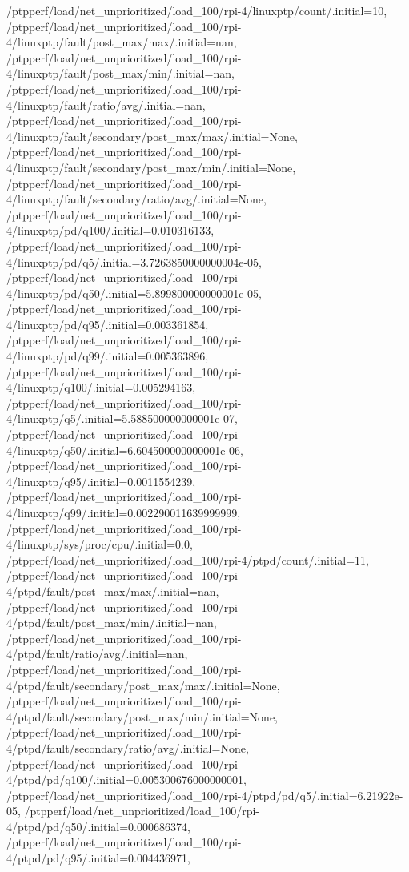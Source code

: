 {    /ptpperf/load/net_unprioritized/load_100/rpi-4/linuxptp/count/.initial=10,
    /ptpperf/load/net_unprioritized/load_100/rpi-4/linuxptp/fault/post_max/max/.initial=nan,
    /ptpperf/load/net_unprioritized/load_100/rpi-4/linuxptp/fault/post_max/min/.initial=nan,
    /ptpperf/load/net_unprioritized/load_100/rpi-4/linuxptp/fault/ratio/avg/.initial=nan,
    /ptpperf/load/net_unprioritized/load_100/rpi-4/linuxptp/fault/secondary/post_max/max/.initial=None,
    /ptpperf/load/net_unprioritized/load_100/rpi-4/linuxptp/fault/secondary/post_max/min/.initial=None,
    /ptpperf/load/net_unprioritized/load_100/rpi-4/linuxptp/fault/secondary/ratio/avg/.initial=None,
    /ptpperf/load/net_unprioritized/load_100/rpi-4/linuxptp/pd/q100/.initial=0.010316133,
    /ptpperf/load/net_unprioritized/load_100/rpi-4/linuxptp/pd/q5/.initial=3.7263850000000004e-05,
    /ptpperf/load/net_unprioritized/load_100/rpi-4/linuxptp/pd/q50/.initial=5.899800000000001e-05,
    /ptpperf/load/net_unprioritized/load_100/rpi-4/linuxptp/pd/q95/.initial=0.003361854,
    /ptpperf/load/net_unprioritized/load_100/rpi-4/linuxptp/pd/q99/.initial=0.005363896,
    /ptpperf/load/net_unprioritized/load_100/rpi-4/linuxptp/q100/.initial=0.005294163,
    /ptpperf/load/net_unprioritized/load_100/rpi-4/linuxptp/q5/.initial=5.588500000000001e-07,
    /ptpperf/load/net_unprioritized/load_100/rpi-4/linuxptp/q50/.initial=6.604500000000001e-06,
    /ptpperf/load/net_unprioritized/load_100/rpi-4/linuxptp/q95/.initial=0.0011554239,
    /ptpperf/load/net_unprioritized/load_100/rpi-4/linuxptp/q99/.initial=0.002290011639999999,
    /ptpperf/load/net_unprioritized/load_100/rpi-4/linuxptp/sys/proc/cpu/.initial=0.0,
    /ptpperf/load/net_unprioritized/load_100/rpi-4/ptpd/count/.initial=11,
    /ptpperf/load/net_unprioritized/load_100/rpi-4/ptpd/fault/post_max/max/.initial=nan,
    /ptpperf/load/net_unprioritized/load_100/rpi-4/ptpd/fault/post_max/min/.initial=nan,
    /ptpperf/load/net_unprioritized/load_100/rpi-4/ptpd/fault/ratio/avg/.initial=nan,
    /ptpperf/load/net_unprioritized/load_100/rpi-4/ptpd/fault/secondary/post_max/max/.initial=None,
    /ptpperf/load/net_unprioritized/load_100/rpi-4/ptpd/fault/secondary/post_max/min/.initial=None,
    /ptpperf/load/net_unprioritized/load_100/rpi-4/ptpd/fault/secondary/ratio/avg/.initial=None,
    /ptpperf/load/net_unprioritized/load_100/rpi-4/ptpd/pd/q100/.initial=0.005300676000000001,
    /ptpperf/load/net_unprioritized/load_100/rpi-4/ptpd/pd/q5/.initial=6.21922e-05,
    /ptpperf/load/net_unprioritized/load_100/rpi-4/ptpd/pd/q50/.initial=0.000686374,
    /ptpperf/load/net_unprioritized/load_100/rpi-4/ptpd/pd/q95/.initial=0.004436971,
}
